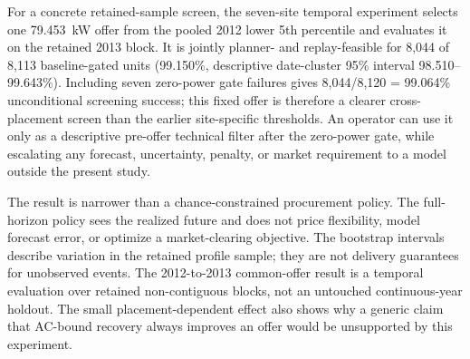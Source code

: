 \documentclass[11pt]{article}
\begin{document}
For a concrete retained-sample screen, the seven-site temporal experiment selects one 79.453~kW offer from the pooled 2012 lower 5th percentile and evaluates it on the retained 2013 block. It is jointly planner- and replay-feasible for 8,044 of 8,113 baseline-gated units (99.150\%, descriptive date-cluster 95\% interval 98.510--99.643\%). Including seven zero-power gate failures gives 8,044/8,120 = 99.064\% unconditional screening success; this fixed offer is therefore a clearer cross-placement screen than the earlier site-specific thresholds. An operator can use it only as a descriptive pre-offer technical filter after the zero-power gate, while escalating any forecast, uncertainty, penalty, or market requirement to a model outside the present study.

The result is narrower than a chance-constrained procurement policy. The full-horizon policy sees the realized future and does not price flexibility, model forecast error, or optimize a market-clearing objective. The bootstrap intervals describe variation in the retained profile sample; they are not delivery guarantees for unobserved events. The 2012-to-2013 common-offer result is a temporal evaluation over retained non-contiguous blocks, not an untouched continuous-year holdout. The small placement-dependent effect also shows why a generic claim that AC-bound recovery always improves an offer would be unsupported by this experiment.
\end{document}
